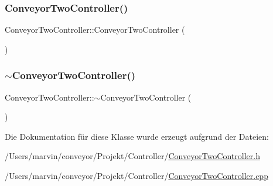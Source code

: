 \subsubsection{\texorpdfstring{Conveyor\+Two\+Controller()}{ConveyorTwoController()}}
{\footnotesize\ttfamily Conveyor\+Two\+Controller\+::\+Conveyor\+Two\+Controller (\begin{DoxyParamCaption}{ }\end{DoxyParamCaption})}

\hypertarget{class_conveyor_two_controller_a7b2d996e62a8467455279ce295b5c889}{}\label{class_conveyor_two_controller_a7b2d996e62a8467455279ce295b5c889} 
\subsubsection{\texorpdfstring{$\sim$\+Conveyor\+Two\+Controller()}{~ConveyorTwoController()}}
{\footnotesize\ttfamily Conveyor\+Two\+Controller\+::$\sim$\+Conveyor\+Two\+Controller (\begin{DoxyParamCaption}{ }\end{DoxyParamCaption})\hspace{0.3cm}{\ttfamily [virtual]}}



Die Dokumentation für diese Klasse wurde erzeugt aufgrund der Dateien\+:\begin{DoxyCompactItemize}
\item 
/\+Users/marvin/conveyor/\+Projekt/\+Controller/\hyperlink{_conveyor_two_controller_8h}{Conveyor\+Two\+Controller.\+h}\item 
/\+Users/marvin/conveyor/\+Projekt/\+Controller/\hyperlink{_conveyor_two_controller_8cpp}{Conveyor\+Two\+Controller.\+cpp}\end{DoxyCompactItemize}
